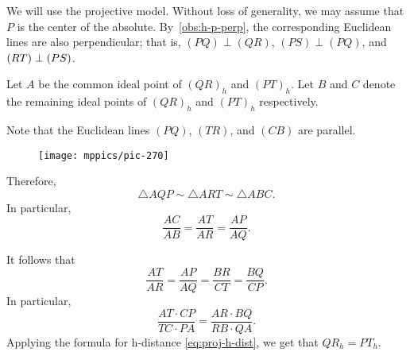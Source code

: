 We will use the projective model.
Without loss of generality, we may assume that $P$ is the center of the absolute.
By~\ref{obs:h-p-perp},
the corresponding Euclidean lines are also perpendicular;
that is, $(PQ)\perp (QR)$, $(PS)\perp(PQ)$, and $(RT)\perp (PS)$.

Let $A$ be the common ideal point of $(QR)_h$ and $(PT)_h$.
Let $B$ and $C$ denote the remaining ideal points of $(QR)_h$ and $(PT)_h$ respectively.

Note that the Euclidean lines $(PQ)$, $(TR)$, and $(CB)$ are parallel.

\begin{wrapfigure}{o}{55mm}
\vskip-2mm
\centering
\texttt{[image: mppics/pic-270]}
\vskip2mm
\end{wrapfigure}

Therefore, 
\[\triangle AQP\sim \triangle ART \sim\triangle ABC.\]
In particular,
\[\frac{AC}{AB}=\frac{AT}{AR}=\frac{AP}{AQ}.\]

It follows that
\[\frac{AT}{AR}=\frac{AP}{AQ}=\frac{BR}{CT}=\frac{BQ}{CP}.\]
In particular, 
\[\frac{AT\cdot CP}{TC\cdot PA}=\frac{AR\cdot BQ}{RB\cdot QA}.\]
Applying the formula for h-distance \ref{eq:proj-h-dist}, we get that $QR_h=PT_h$.
\qeds
